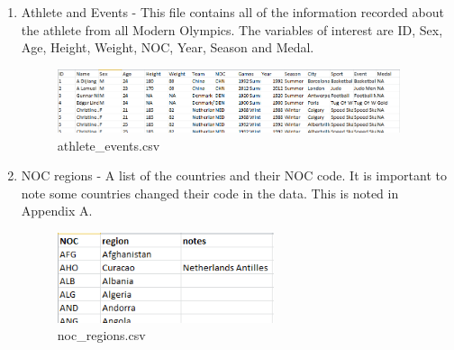 \documentclass[a4 paper, 12pt]{article}
\begin{document}
        \begin{enumerate}
            \item Athlete and Events - This file contains all of the information recorded about the athlete from all Modern Olympics. The variables of interest are ID, Sex, Age, Height, Weight, NOC, Year, Season and Medal. 
                \begin{figure} [H]
                    \centering
                    \includegraphics[width=0.95\textwidth, frame]
                        {./images/data/athlete_events.png} 
                    \caption{athlete\_events.csv}                  
                \end{figure}            
            \item NOC regions - A list of the countries and their NOC code. It is important to note some countries changed their code in the data. This is noted in Appendix A. 
                \begin{figure}[H]
                    \centering
                    \includegraphics[width=0.6\textwidth, frame]
                    {./images/data/noc_regions.png}   
                    \caption{noc\_regions.csv}                 
            \end{figure}
        \end{enumerate}
\end{document}
